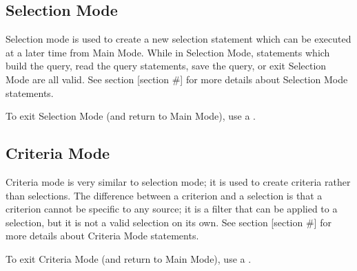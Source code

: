 \subsection{Selection Mode}

Selection mode is used to create a new selection statement which can be executed at a later time from Main Mode.
While in Selection Mode, statements which build the query, read the query statements, save the query, or exit
Selection Mode are all valid. See section [section \#] for more details about Selection Mode statements.

To exit Selection Mode (and return to Main Mode), use a .

\subsection{Criteria Mode}
Criteria mode is very similar to selection mode; it is used to create criteria rather than selections.
The difference between a criterion and a selection is that a criterion cannot be specific to any source;
it is a filter that can be applied to a selection, but it is not a valid selection on its own.
See section [section \#] for more details about Criteria Mode statements.

To exit Criteria Mode (and return to Main Mode), use a .
